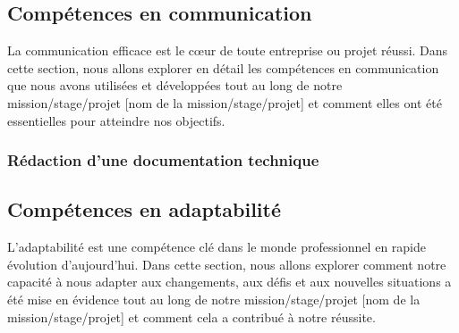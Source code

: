 \documentclass[a4paper, 12pt, french]{article}
\begin{document}
			\subsection{Compétences en communication}
				La communication efficace est le cœur de toute entreprise ou projet réussi. Dans cette section, nous allons explorer en détail les compétences en communication que nous avons utilisées et développées tout au long de notre mission/stage/projet [nom de la mission/stage/projet] et comment elles ont été essentielles pour atteindre nos objectifs.
				
				\subsubsection{Rédaction d'une documentation technique}			


			
			
			\subsection{Compétences en adaptabilité}
				L'adaptabilité est une compétence clé dans le monde professionnel en rapide évolution d'aujourd'hui. Dans cette section, nous allons explorer comment notre capacité à nous adapter aux changements, aux défis et aux nouvelles situations a été mise en évidence tout au long de notre mission/stage/projet [nom de la mission/stage/projet] et comment cela a contribué à notre réussite.
				
\end{document}
